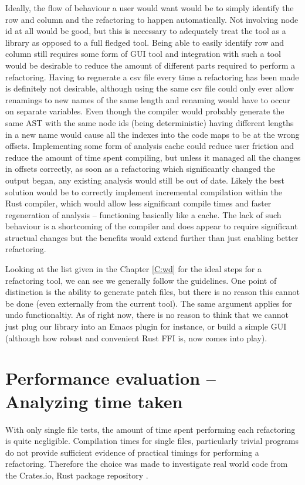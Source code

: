 Ideally, the flow of behaviour a user would want would be to simply identify the row and column and the refactoring to happen automatically. Not involving node id at all would be good, but this is necessary to adequately treat the tool as a library as opposed to a full fledged tool. Being able to easily identify row and column still requires some form of GUI tool and integration with such a tool would be desirable to reduce the amount of different parts required to perform a refactoring. Having to regnerate a csv file every time a refactoring has been made is definitely not desirable, although using the same csv file could only ever allow renamings to new names of the same length and renaming would have to occur on separate variables. Even though the compiler would probably generate the same AST with the same node ids (being deterministic) having different lengths in a new name would cause all the indexes into the code maps to be at the wrong offsets. Implementing some form of analysis cache could reduce user friction and reduce the amount of time spent compiling, but unless it managed all the changes in offsets correctly, as soon as a refactoring which significantly changed the output began, any existing analysis would still be out of date. Likely the best solution would be to correctly implement incremental compilation within the Rust compiler, which would allow less significant compile times and faster regeneration of analysis -- functioning basically like a cache. The lack of such behaviour is a shortcoming of the compiler and does appear to require significant structual changes but the benefits would extend further than just enabling better refactoring.

Looking at the list given in the Chapter \ref{C:wd} for the ideal steps for a refactoring tool, we can see we generally follow the guidelines. One point of distinction is the ability to generate patch files, but there is no reason this cannot be done (even externally from the current tool). The same argument applies for undo functionaltiy. As of right now, there is no reason to think that we cannot just plug our library into an Emacs plugin for instance, or build a simple GUI (although how robust and convenient Rust FFI is, now comes into play).


\section{Performance evaluation -- Analyzing time taken}\label{S:perfeval}
With only single file tests, the amount of time spent performing each refactoring is quite negligible. Compilation times for single files, particularly trivial programs do not provide sufficient evidence of practical timings for performing a refactoring. Therefore the choice was made to investigate real world code from the Crates.io, Rust package repository \cite{cratesio15}. 

